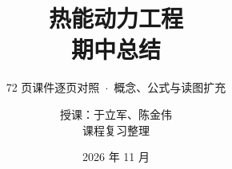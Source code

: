 \documentclass[aspectratio=169,fontset=fandol,10pt]{ctexbeamer}
\title[热能动力工程·期中总结]{热能动力工程\\[0.5mm]期中总结}
\subtitle{72 页课件逐页对照 \,$\cdot$\, 概念、公式与读图扩充}
\author[课程复习]{授课：于立军、陈金伟\\[0.4mm]课程复习整理}
\institute[SJTU]{上海交通大学\,\textperiodcentered\,热能动力工程}
\date{2026 年 11 月}
\begin{document}
\begin{frame}[plain]
  \titlepage
\end{frame}








\end{document}
